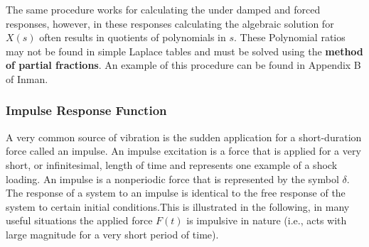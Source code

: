 \documentclass[12pt,letter]{article}
\numberwithin{ex}{section} %
\newcommand{\Laplace}[1]{\ensuremath{\mathcal{L}{\left[#1\right]}}}
\begin{document}
The same procedure works for calculating the under damped and forced responses, however, in these responses calculating the algebraic solution for $X(s)$ often results in quotients of polynomials in $s$. These Polynomial ratios may not be found in simple Laplace tables and must be solved using the \textbf{method of partial fractions}. An example of this procedure can be found in Appendix B of Inman. 


\subsubsection{Impulse Response Function}
A very common source of vibration is the sudden application for a short-duration force called an impulse. An impulse excitation is a force that is applied for a very short, or infinitesimal, length of time and represents one example of a shock loading. An impulse is a nonperiodic force that is represented by the symbol $\delta$. The response of a system to an impulse is identical to the free response of the system to certain initial conditions.This is illustrated in the following, in many useful situations the applied force $F(t)$ is impulsive in nature
(i.e., acts with large magnitude for a very short period of time).
\end{document}
